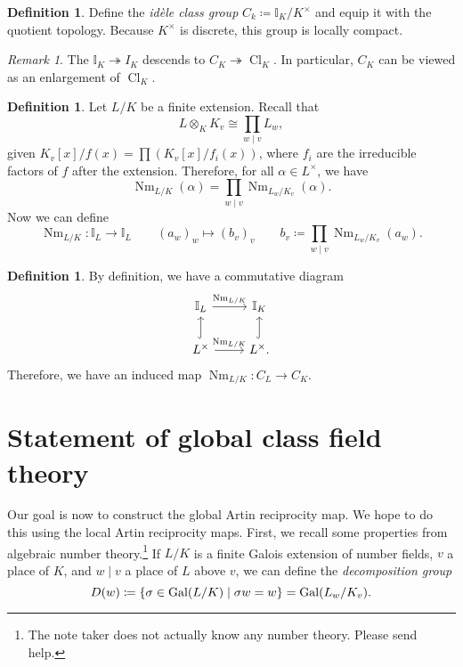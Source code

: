 \documentclass[leqno, openany]{memoir}
\theoremstyle{definition}
\newtheorem{defn}[thm]{Definition}
\theoremstyle{remark}
\newtheorem{rmk}[thm]{Remark}
\theoremstyle{plain}
\theoremstyle{definition}
\theoremstyle{remark}
\newcommand{\I}{\mathbb{I}}
\DeclareMathOperator{\Gal}{Gal}
\DeclareMathOperator{\Cl}{Cl}
\DeclareMathOperator{\Nm}{Nm}
\begin{document}
\begin{defn} Define the \textit{id\`ele class group} $C_k \coloneqq \I_K /
K^{\times}$ and equip it with the quotient topology. Because $K^{\times}$ is
discrete, this group is locally compact.  \end{defn}

\begin{rmk} The $\I_K \twoheadrightarrow I_K$ descends to $C_K
\twoheadrightarrow \Cl_K$. In particular, $C_K$ can be viewed as an enlargement
of $\Cl_K$.  \end{rmk}

\begin{defn} Let $L/K$ be a finite extension. Recall that \[ L \otimes_K K_v
\cong \prod_{w \mid v} L_w, \] given $K_v[x]/f(x) = \prod (K_v[x]/f_i(x))$,
where $f_i$ are the irreducible factors of $f$ after the extension. Therefore,
for all $\alpha \in L^{\times}$, we have \[ \Nm_{L/K}(\alpha) = \prod_{w \mid
    v} \Nm_{L_w/K_v} (\alpha). \] Now we can define \[ \Nm_{L/K} \colon \I_L
\to \I_L \qquad {(a_w)}_w \mapsto {(b_v)}_v \qquad b_v \coloneqq \prod_{w \mid
v} \Nm_{L_w/K_v}(a_w). \] \end{defn}

\begin{defn} By definition, we have a commutative diagram \begin{equation*}
    \begin{tikzcd} \I_L \ar{r}{\Nm_{L/K}} & \I_K \\ L^{\times}
    \ar[hookrightarrow]{u} \ar{r}{\Nm_{L/K}} & L^{\times}.
\ar[hookrightarrow]{u} \end{tikzcd} \end{equation*} Therefore, we have an
induced map $\Nm_{L/K} \colon C_L \to C_K$.  \end{defn}

\section{Statement of global class field theory}%
\label{sec:statement_of_global_class_field_theory}

Our goal is now to construct the global Artin reciprocity map. We hope to do
this using the local Artin reciprocity maps. First, we recall some properties
from algebraic number theory.\footnote{The note taker does not actually know
any number theory. Please send help.} If $L/K$ is a finite Galois extension of
number fields, $v$ a place of $K$, and $w \mid v$ a place of $L$ above $v$, we
can define the \textit{decomposition group} \[ D(w) \coloneqq \qty{\sigma \in
\Gal(L/K) \mid \sigma w = w} = \Gal(L_w/K_v). \]
\end{document}
